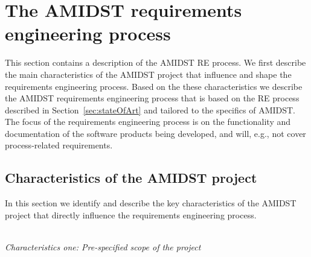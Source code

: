 \section{The AMIDST requirements engineering process}
\label{sec:AmidstRequirementProcess}

This section contains a description of the AMIDST RE process.  We first describe the main characteristics of the AMIDST project that
influence and shape the requirements engineering process. Based on the these characteristics we describe the
AMIDST requirements engineering process that is based on the RE process \cite{} described in
Section~\ref{sec:stateOfArt} and tailored to the specifics of AMIDST. The focus of the requirements engineering process
is on the functionality and documentation of the software products being developed, and will, e.g., not cover process-related requirements.





\subsection{Characteristics of the AMIDST project}
\label{sec:characteristics}

In this section we identify and describe the key characteristics of the AMIDST project that directly influence the requirements
engineering process. 


\ \\
\noindent \emph{Characteristics one:  Pre-specified scope of the project}
\label{sec:characteristic1}

